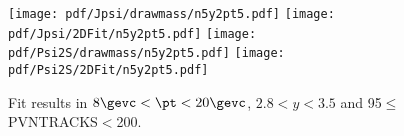 \begin{figure}[H]
\begin{center}
\texttt{[image: pdf/Jpsi/drawmass/n5y2pt5.pdf]}
\texttt{[image: pdf/Jpsi/2DFit/n5y2pt5.pdf]}
\vspace*{-0.5cm}
\texttt{[image: pdf/Psi2S/drawmass/n5y2pt5.pdf]}
\texttt{[image: pdf/Psi2S/2DFit/n5y2pt5.pdf]}
\vspace*{-0.5cm}
\end{center}
\caption{Fit results in $8\gevc<\pt<20\gevc$, $2.8<y<3.5$ and 95$\leq$PVNTRACKS$<$200.}
\label{Fitn5y2pt5}
\end{figure}
